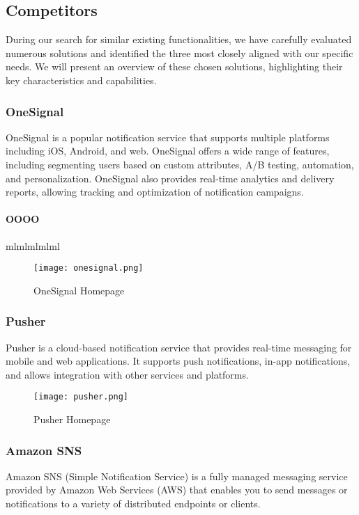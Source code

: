 \subsection{Competitors}
During our search for similar existing functionalities, we have carefully evaluated numerous solutions 
and identified the three most closely aligned with our specific needs.
We will present an overview of these chosen solutions, highlighting their key characteristics and capabilities.

\subsubsection{OneSignal} 
OneSignal is a popular notification service that supports multiple platforms including iOS, Android, and web. 
OneSignal offers a wide range of features, including segmenting users based on custom attributes, A/B testing, 
automation, and personalization. OneSignal also provides real-time analytics and delivery reports, allowing 
tracking and optimization of notification campaigns.

\paragraph{OOOO}
mlmlmlmlml

\begin{figure}[hbt!]
    \centering
    \texttt{[image: onesignal.png]}
    \caption{OneSignal Homepage}
\end{figure}

\subsubsection{Pusher}
Pusher is a cloud-based notification service that provides real-time messaging for mobile and web applications.
It supports push notifications, in-app notifications, and allows integration with other services and platforms. \\

\begin{figure}[hbt!]
    \centering
    \texttt{[image: pusher.png]}
    \caption{Pusher Homepage}
\end{figure}

\subsubsection{Amazon SNS}
Amazon SNS (Simple Notification Service) is a fully managed messaging service provided by Amazon Web 
Services (AWS) that enables you to send messages or notifications to a variety of distributed endpoints 
or clients. \\


